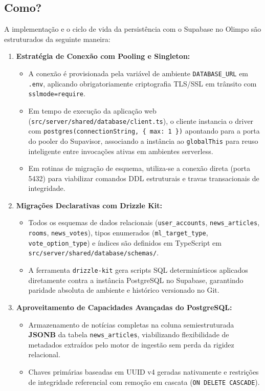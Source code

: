 \documentclass[12pt,a4paper]{article}
\begin{document}
\subsection{Como?}
A implementação e o ciclo de vida da persistência com o Supabase no Olimpo são estruturados da seguinte maneira:
\begin{enumerate}
  \item \textbf{Estratégia de Conexão com Pooling e Singleton:}
  \begin{itemize}
    \item A conexão é provisionada pela variável de ambiente \texttt{DATABASE\_URL} em \texttt{.env}, aplicando obrigatoriamente criptografia TLS/SSL em trânsito com \texttt{sslmode=require}.
    \item Em tempo de execução da aplicação web (\texttt{src/server/shared/database/client.ts}), o cliente instancia o driver com \texttt{postgres(connectionString, \{ max: 1 \})} apontando para a porta do pooler do Supavisor, associando a instância ao \texttt{globalThis} para reuso inteligente entre invocações ativas em ambientes serverless.
    \item Em rotinas de migração de esquema, utiliza-se a conexão direta (porta 5432) para viabilizar comandos DDL estruturais e travas transacionais de integridade.
  \end{itemize}
  \item \textbf{Migrações Declarativas com Drizzle Kit:}
  \begin{itemize}
    \item Todos os esquemas de dados relacionais (\texttt{user\_accounts}, \texttt{news\_articles}, \texttt{rooms}, \texttt{news\_votes}), tipos enumerados (\texttt{ml\_target\_type}, \texttt{vote\_option\_type}) e índices são definidos em TypeScript em \texttt{src/server/shared/database/schemas/}.
    \item A ferramenta \texttt{drizzle-kit} gera scripts SQL determinísticos aplicados diretamente contra a instância PostgreSQL no Supabase, garantindo paridade absoluta de ambiente e histórico versionado no Git.
  \end{itemize}
  \item \textbf{Aproveitamento de Capacidades Avançadas do PostgreSQL:}
  \begin{itemize}
    \item Armazenamento de notícias completas na coluna semiestruturada \textbf{JSONB} da tabela \texttt{news\_articles}, viabilizando flexibilidade de metadados extraídos pelo motor de ingestão sem perda da rigidez relacional.
    \item Chaves primárias baseadas em UUID v4 geradas nativamente e restrições de integridade referencial com remoção em cascata (\texttt{ON DELETE CASCADE}).
  \end{itemize}
\end{enumerate}
\end{document}
